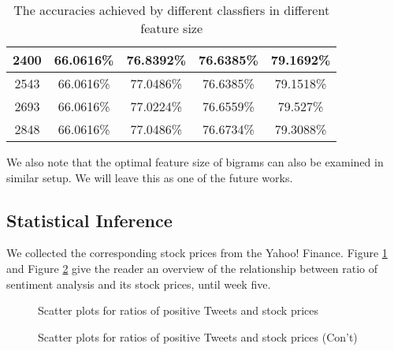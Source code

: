 \documentclass[12pt]{article}
\begin{document}
\begin{table}
\begin{center}
\begin{tabular}{ | c || c | c | c | c | }
        2400 & 66.0616\% & 76.8392\% & 76.6385\% & 79.1692\% \\ \hline
        2543 & 66.0616\% & 77.0486\% & 76.6385\% & 79.1518\% \\ \hline
        2693 & 66.0616\% & 77.0224\% & 76.6559\% & 79.527\% \\ \hline
        2848 & 66.0616\% & 77.0486\% & 76.6734\% & 79.3088\% \\ \hline
    \end{tabular}
\caption{The accuracies achieved by different classfiers in different feature size}
\label{classifiers-feature-size-tbl}
\end{center}
\end{table}


We also note that the optimal feature size of bigrams can also be examined in similar setup. We will leave this as one of the future works.

\subsection{Statistical Inference}
We collected the corresponding stock prices from the Yahoo! Finance. Figure \ref{xyplots-ratio-price} and Figure \ref{xyplots-ratio-price-02} give the reader an overview of the relationship between ratio of sentiment analysis and its stock prices, until week five.

\begin{figure}
\centering
\caption{Scatter plots for ratios of positive Tweets and stock prices}
\label{xyplots-ratio-price}
\end{figure}

\begin{figure}
\centering
\caption{Scatter plots for ratios of positive Tweets and stock prices (Con't)}
\label{xyplots-ratio-price-02}
\end{figure}
\end{document}
